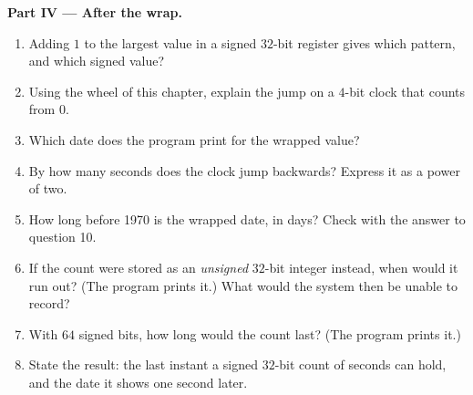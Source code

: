 \begin{problem}
\medskip\noindent\textbf{Part IV --- After the wrap.}
\begin{enumerate}[resume]
  \item Adding $1$ to the largest value in a signed $32$-bit register gives which pattern, and which signed value?
  \item Using the wheel of this chapter, explain the jump on a $4$-bit clock that counts from $0$.
  \item Which date does the program print for the wrapped value?
  \item By how many seconds does the clock jump backwards? Express it as a power of two.
  \item How long before 1970 is the wrapped date, in days? Check with the answer to question 10.
  \item If the count were stored as an \emph{unsigned} $32$-bit integer instead, when would it run out? (The program
    prints it.) What would the system then be unable to record?
  \item With $64$ signed bits, how long would the count last? (The program prints it.)
  \item State the result: the last instant a signed $32$-bit count of seconds can hold, and the date it shows one
    second later.
\end{enumerate}
\end{problem}
